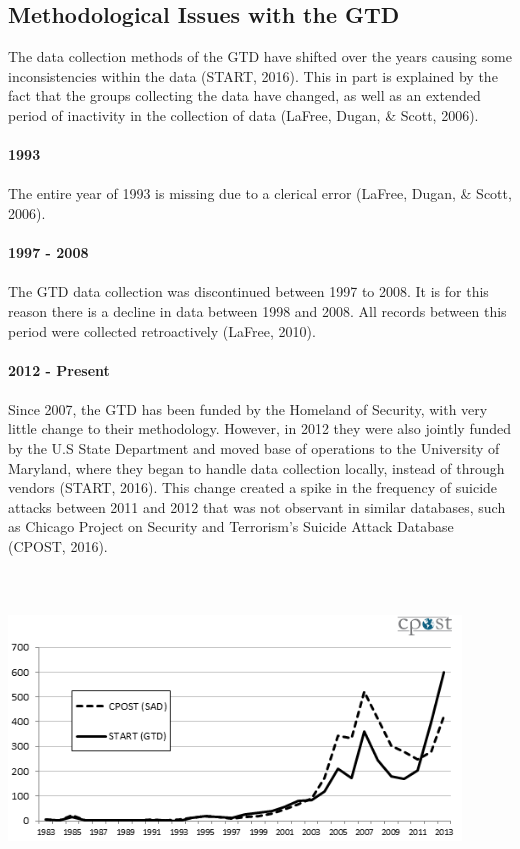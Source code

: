 \documentclass[10pt,a4paper]{article}
\begin{document}
\subsection{Methodological Issues with the GTD}

The data collection methods of the GTD have shifted over the years causing some inconsistencies within the data (START, 2016). This in part is explained by the fact that the groups collecting the data have changed, as well as an extended period of inactivity in the collection of data (LaFree, Dugan, \& Scott, 2006).
\\\\

\textbf{1993}\\\\
The entire year of 1993 is missing due to a clerical error (LaFree, Dugan, \& Scott, 2006).\\\\

\textbf{1997 - 2008}\\\\
The GTD data collection was discontinued between 1997 to 2008. It is for this reason there is a decline in data between 1998 and 2008. All records between this period were collected retroactively (LaFree, 2010).
\\\\

\textbf{2012 - Present}\\\\
Since 2007, the GTD has been funded by the Homeland of Security, with very little change to their methodology. However, in 2012 they were also jointly funded by the U.S State Department and moved base of operations to the University of Maryland, where they began to handle data collection locally, instead of through vendors (START, 2016). This change created a spike in the frequency of suicide attacks between 2011 and 2012 that was not observant in similar databases, such as Chicago Project on Security and Terrorism’s Suicide Attack Database (CPOST, 2016).
\\\\
\\\\

\includegraphics[width=0.9\textwidth]{backgroundpic1.png}
\\\\
\\\\
\end{document}
